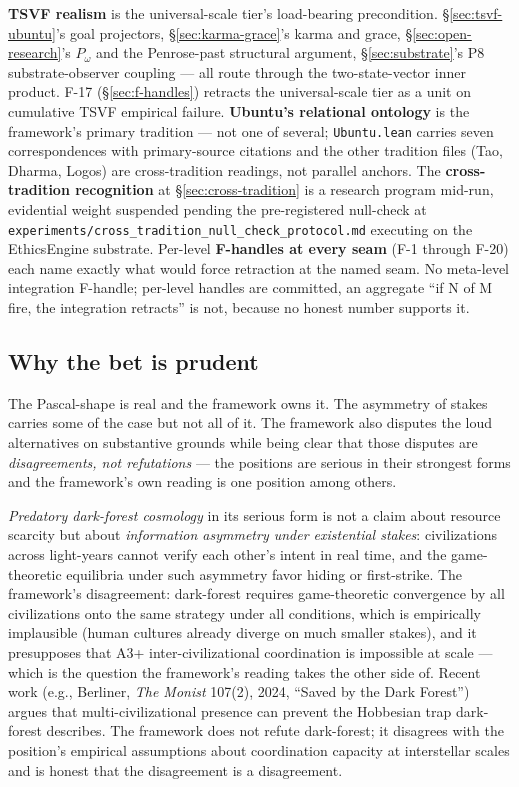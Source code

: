 \documentclass[11pt,a4paper]{article}
\newcommand{\Pomega}{P_{\omega}}
\begin{document}
\textbf{TSVF realism} is the universal-scale tier's load-bearing precondition. \S\ref{sec:tsvf-ubuntu}'s goal projectors, \S\ref{sec:karma-grace}'s karma and grace, \S\ref{sec:open-research}'s $\Pomega$ and the Penrose-past structural argument, \S\ref{sec:substrate}'s P8 substrate-observer coupling --- all route through the two-state-vector inner product. F-17 (\S\ref{sec:f-handles}) retracts the universal-scale tier as a unit on cumulative TSVF empirical failure. \textbf{Ubuntu's relational ontology} is the framework's primary tradition --- not one of several; \texttt{Ubuntu.lean} carries seven correspondences with primary-source citations and the other tradition files (Tao, Dharma, Logos) are cross-tradition readings, not parallel anchors. The \textbf{cross-tradition recognition} at \S\ref{sec:cross-tradition} is a research program mid-run, evidential weight suspended pending the pre-registered null-check at \texttt{experiments/cross\_tradition\_null\_check\_protocol.md} executing on the EthicsEngine substrate. Per-level \textbf{F-handles at every seam} (F-1 through F-20) each name exactly what would force retraction at the named seam. No meta-level integration F-handle; per-level handles are committed, an aggregate ``if N of M fire, the integration retracts'' is not, because no honest number supports it.

\subsection*{Why the bet is prudent}

The Pascal-shape is real and the framework owns it. The asymmetry of stakes carries some of the case but not all of it. The framework also disputes the loud alternatives on substantive grounds while being clear that those disputes are \emph{disagreements, not refutations} --- the positions are serious in their strongest forms and the framework's own reading is one position among others.

\emph{Predatory dark-forest cosmology} in its serious form is not a claim about resource scarcity but about \emph{information asymmetry under existential stakes}: civilizations across light-years cannot verify each other's intent in real time, and the game-theoretic equilibria under such asymmetry favor hiding or first-strike. The framework's disagreement: dark-forest requires game-theoretic convergence by all civilizations onto the same strategy under all conditions, which is empirically implausible (human cultures already diverge on much smaller stakes), and it presupposes that A3+ inter-civilizational coordination is impossible at scale --- which is the question the framework's reading takes the other side of. Recent work (e.g., Berliner, \emph{The Monist} 107(2), 2024, ``Saved by the Dark Forest'') argues that multi-civilizational presence can prevent the Hobbesian trap dark-forest describes. The framework does not refute dark-forest; it disagrees with the position's empirical assumptions about coordination capacity at interstellar scales and is honest that the disagreement is a disagreement.
\end{document}
